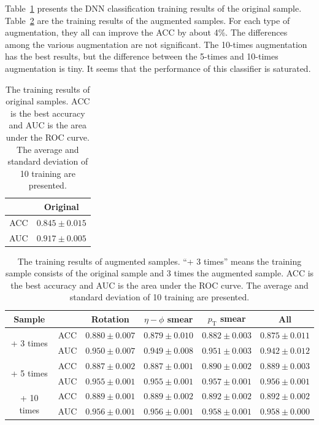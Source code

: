 \documentclass[12pt]{article}
\begin{document}
        Table~\ref{tab:original_sample_training_results} presents the DNN classification training results of the original sample. Table~\ref{tab:augmentation_sample_training_results} are the training results of the augmented samples. For each type of augmentation, they all can improve the ACC by about 4\%. The differences among the various augmentation are not significant. The 10-times augmentation has the best results, but the difference between the 5-times and 10-times augmentation is tiny. It seems that the performance of this classifier is saturated.
        \begin{table}[htpb]
            \centering
            \caption{The training results of original samples. ACC is the best accuracy and AUC is the area under the ROC curve. The average and standard deviation of 10 training are presented.}
            \label{tab:original_sample_training_results}
            \begin{tabular}{c|c}
                & Original \\ \hline
            ACC & $0.845 \pm 0.015$    \\
            AUC & $0.917 \pm 0.005$
            \end{tabular}
        \end{table}
        \begin{table}[htpb]
            \centering
            \caption{The training results of augmented samples. ``+ 3 times'' means the training sample consists of the original sample and 3 times the augmented sample. ACC is the best accuracy and AUC is the area under the ROC curve. The average and standard deviation of 10 training are presented.}
            \label{tab:augmentation_sample_training_results}
            \begin{tabular}{c|c|cccc}
                Sample                      &     & Rotation          & $\eta-\phi$ smear & $p_{\text{T}}$ smear & All               \\ \hline
                \multirow{2}{*}{+ 3 times}  & ACC & $0.880 \pm 0.007$ & $0.879 \pm 0.010$ & $0.882 \pm 0.003$    & $0.875 \pm 0.011$ \\
                                            & AUC & $0.950 \pm 0.007$ & $0.949 \pm 0.008$ & $0.951 \pm 0.003$    & $0.942 \pm 0.012$ \\ \hline
                \multirow{2}{*}{+ 5 times}  & ACC & $0.887 \pm 0.002$ & $0.887 \pm 0.001$ & $0.890 \pm 0.002$    & $0.889 \pm 0.003$ \\
                                            & AUC & $0.955 \pm 0.001$ & $0.955 \pm 0.001$ & $0.957 \pm 0.001$    & $0.956 \pm 0.001$ \\ \hline
                \multirow{2}{*}{+ 10 times} & ACC & $0.889 \pm 0.001$ & $0.889 \pm 0.002$ & $0.892 \pm 0.002$    & $0.892 \pm 0.002$ \\
                                            & AUC & $0.956 \pm 0.001$ & $0.956 \pm 0.001$ & $0.958 \pm 0.001$    & $0.958 \pm 0.000$
            \end{tabular}
        \end{table}
\end{document}
